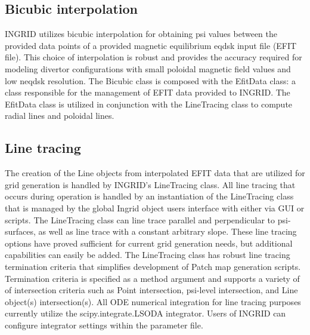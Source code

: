 \subsection{\label{sec:level2}Bicubic interpolation}
INGRID utilizes bicubic interpolation for obtaining psi values between the provided data points of a provided magnetic equilibrium eqdsk input file (EFIT file). This choice of interpolation is robust and provides the accuracy required for modeling divertor configurations with small poloidal magnetic field values and low neqdsk resolution. The Bicubic class is composed with the EfitData class: a class responsible for the management of EFIT data provided to INGRID. The EfitData class is utilized in conjunction with the LineTracing class to compute radial lines and poloidal lines. 

\subsection{\label{sec:level2}Line tracing}
The creation of the Line objects from interpolated EFIT data that are utilized for grid generation is handled by INGRID's LineTracing class. All line tracing that occurs during operation is handled by an instantiation of the LineTracing class that is managed by the global Ingrid object users interface with either via GUI or scripts. The LineTracing class can line trace parallel and perpendicular to psi-surfaces, as well as line trace with a constant arbitrary slope. These line tracing options have proved sufficient for current grid generation needs, but additional capabilities can easily be added. The LineTracing class has robust line tracing termination criteria that simplifies development of Patch map generation scripts. Termination criteria is specified as a method argument and supports a variety of of intersection criteria such as Point intersection, psi-level intersection, and Line object(s) intersection(s). All ODE numerical integration for line tracing purposes currently utilize the scipy.integrate.LSODA integrator. Users of INGRID can configure integrator settings within the parameter file.
